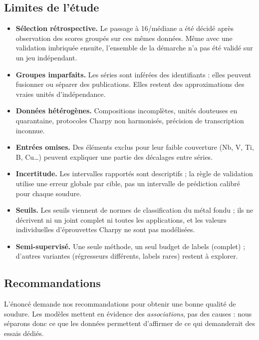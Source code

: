 \subsection{Limites de l'étude}

\begin{itemize}
  \item \textbf{Sélection rétrospective.} Le passage à 16/médiane a été décidé après observation des scores groupés sur ces mêmes données. Même avec une validation imbriquée ensuite, l'ensemble de la démarche n'a pas été validé sur un jeu indépendant.
  \item \textbf{Groupes imparfaits.} Les séries sont inférées des identifiants : elles peuvent fusionner ou séparer des publications. Elles restent des approximations des vraies unités d'indépendance.
  \item \textbf{Données hétérogènes.} Compositions incomplètes, unités douteuses en quarantaine, protocoles Charpy non harmonisés, précision de transcription inconnue.
  \item \textbf{Entrées omises.} Des éléments exclus pour leur faible couverture (Nb, V, Ti, B, Cu\ldots) peuvent expliquer une partie des décalages entre séries.
  \item \textbf{Incertitude.} Les intervalles rapportés sont descriptifs ; la règle de validation utilise une erreur globale par cible, pas un intervalle de prédiction calibré pour chaque soudure.
  \item \textbf{Seuils.} Les seuils viennent de normes de classification du métal fondu ; ils ne décrivent ni un joint complet ni toutes les applications, et les valeurs individuelles d'éprouvettes Charpy ne sont pas modélisées.
  \item \textbf{Semi-supervisé.} Une seule méthode, un seul budget de labels (complet) ; d'autres variantes (régresseurs différents, labels rares) restent à explorer.
\end{itemize}

\subsection{Recommandations}
\label{subsec:recommandations}

L'énoncé demande nos recommandations pour obtenir une bonne qualité de soudure.
Les modèles mettent en évidence des \emph{associations}, pas des causes : nous
séparons donc ce que les données permettent d'affirmer de ce qui demanderait des
essais dédiés.

